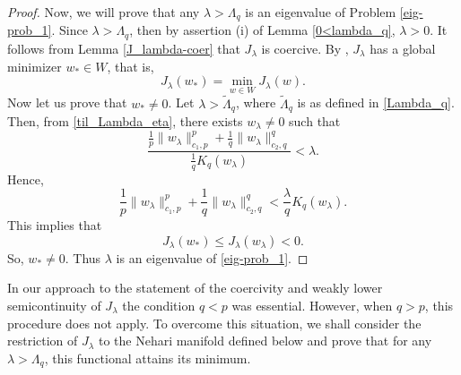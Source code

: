 \documentclass[pdflatex,sn-mathphys-num]{sn-jnl}
\theoremstyle{thmstyleone}%
\theoremstyle{thmstyletwo}%
\theoremstyle{thmstylethree}%
\theoremstyle{thmstylethree}%
\begin{document}
\begin{proof}
Now, we will prove that any $\lambda > \Lambda_q$ is an eigenvalue of Problem \eqref{eig-prob_1}. Since $\lambda > \Lambda_q$, then by assertion (i) of  Lemma \ref{0<lambda_q}, $\lambda>0$. It follows from Lemma \ref{J_lambda-coer} that  $J_\lambda$ is coercive. By \cite[Theorem 1.6 and Remark 1.5.7]{Badiale-Serra_2010}, $J_\lambda $ has a global minimizer $w_* \in W$, that is, 
\begin{equation*}
    J_\lambda (w_*) =\min_{w\in W} J_\lambda (w).
\end{equation*}
Now let us prove that $w_*\neq 0$. Let $\lambda >\tilde{\Lambda}_q$, where $\tilde{\Lambda}_q$ is as  defined in \eqref{Lambda_q}. Then, from \eqref{til_Lambda_eta}, there exists $w_\lambda \neq 0$ such that 
\begin{equation*}
    \frac{\frac{1}{p}\|w_\lambda \|_{c_1,p}^p+\frac{1}{q}\|w_\lambda \|_{c_2,q}^q}{\frac{1}{q}K_q(w_\lambda)}<\lambda .
\end{equation*}
Hence,
\begin{equation*}
    \frac{1}{p}\|w_\lambda \|_{c_1,p}^p+\frac{1}{q}\|w_\lambda \|_{c_2,q}^q< \frac{\lambda}{q}K_q(w_\lambda).
\end{equation*}
This implies that
\begin{equation*}
 J_\lambda (w_*)\leqslant   J_\lambda (w_\lambda) <0.
\end{equation*}
So, $w_* \neq 0$. Thus $\lambda$ is an eigenvalue of \eqref{eig-prob_1}.
\end{proof}


In our approach to the statement of the coercivity and weakly lower semicontinuity of $J_\lambda$ the condition  $q<p$ was essential. However, when $q>p$, this procedure does not apply. To overcome this situation, we shall consider the restriction of $J_{\lambda}$ to the Nehari manifold  defined below and prove that for any $\lambda >\Lambda_q$, this functional attains its minimum.
\end{document}
